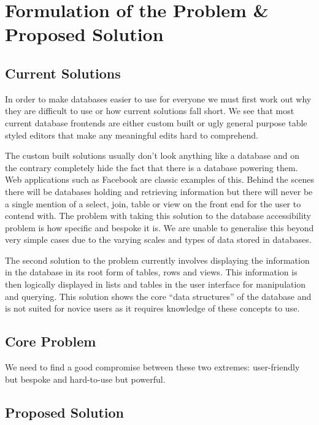 \chapter{Formulation of the Problem \& Proposed Solution}

\section{Current Solutions}

In order to make databases easier to use for everyone we must first work out why they are difficult to use or how current solutions fall short. We see that most current database frontends are either custom built or ugly general purpose table styled editors that make any meaningful edits hard to comprehend.

The custom built solutions usually don't look anything like a database and on the contrary completely hide the fact that there is a database powering them. Web applications such as Facebook are classic examples of this. Behind the scenes there will be databases holding and retrieving information but there will never be a single mention of a select, join, table or view on the front end for the user to contend with. The problem with taking this solution to the database accessibility problem is how specific and bespoke it is. We are unable to generalise this beyond very simple cases due to the varying scales and types of data stored in databases.

The second solution to the problem currently involves displaying the information in the database in its root form of tables, rows and views. This information is then logically displayed in lists and tables in the user interface for manipulation and querying. This solution shows the core ``data structures'' of the database and is not suited for novice users as it requires knowledge of these concepts to use.

\section{Core Problem}

We need to find a good compromise between these two extremes: user-friendly but bespoke and hard-to-use but powerful.

\section{Proposed Solution}